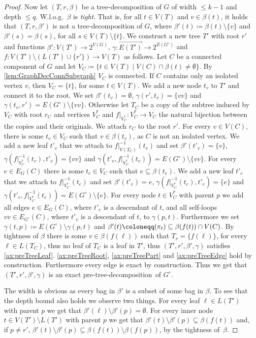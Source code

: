 \documentclass{lmcs}
\theoremstyle{plain}\newtheorem{claim}[thm]{Claim}   %
\let\boundary\relax
\newcommand{\boundary}{\Delta}
\newcommand{\preTreeDec}{pre-tree-decomposition}
\begin{document}
\begin{proof}
	Now let $(T,r,\beta)$ be a tree-decomposition of $G$ of width $\leq k-1$ and depth $\leq q$.
	W.l.o.g.\ $\beta$ is \emph{tight}. That is, for all $t\in V(T)$ and $v\in \beta(t)$, it holds that $(T,r,\beta')$ is not a tree-decomposition of $G$, where $\beta'(t)\coloneqq\beta(t)\setminus\{v\}$ and $\beta'(s)=\beta(s)$, for all $s\in V(T)\setminus \{t\}$.
	We construct a new tree $T'$ with root $r'$ and functions $\beta'\colon V(T')\rightarrow 2^{V(G)}$, $\gamma\colon \overrightarrow{E(T')} \rightarrow 2^{E(G^\circ)}$ and $f\colon V(T')\setminus\left(L(T')\cup\{r'\}\right)\rightarrow V(T)$ as follows.
	Let $C$ be a connected component of $G$ and let $V_C\coloneqq \{t\in V(T)\mid V(C)\cap \beta(t)\neq \emptyset\}$.
	By \autoref{lem:GraphDecConnSubgraph} $V_C$ is connected.
	If $C$ contains only an isolated vertex $v$, then $V_C=\{t\}$, for some $t\in V(T)$.
	We add a new node $t_v$ to $T'$ and connect it to the root.
	We set $\beta'(t_v)=\emptyset$, $\gamma(r',t_v)=\{vv\}$ and $\gamma(t_v,r')= E(G^\circ)\setminus \{vv\}$.
	Otherwise let $T_C$ be a copy of the subtree induced by $V_C$ with root $r_C$ and vertices $V^*_C$ and $f|_{V^*_C}\colon V^*_C\rightarrow V_C$ the natural bijection between the copies and their originals.
	We attach $r_C$ to the root $r'$.
	For every $v\in V(C)$, there is some $t_v\in V_C$ such that $v\in\beta(t_v)$, as $C$ is not an isolated vertex.
	We add a new leaf $t'_v$ that we attach to $f|_{V(T_C)}^{-1}(t_v)$ and set $\beta'(t'_v)=\{v\}$, $\gamma(f|_{V^*_C}^{-1}(t_v),t'_v)=\{vv\}$ and $\gamma(t'_v,f|_{V^*_C}^{-1}(t_v))=E(G^\circ)\setminus \{vv\}$.
	For every $e\in E_G(C)$ there is some $t_e\in V_C$ such that $e\subseteq\beta(t_e)$.
	We add a new leaf $t'_e$ that we attach to $f|_{V^*_C}^{-1}(t_e)$ and set $\beta'(t'_e)=e$, $\gamma(f|_{V^*_C}^{-1}(t_e),t'_e)=\{e\}$ and $\gamma(t'_e,f|_{V^*_C}^{-1}(t_e))=E(G^\circ)\setminus \{e\}$.
	For every node $t\in V^*_C$ with parent $p$ we add all edges $e\in E_G(C)$, where $t'_e$ is a descendant of $t$, and all self-loops $vv\in E_{G^\circ}(C)$, where $t'_v$ is a descendant of $t$, to $\gamma(p,t)$.
	Furthermore we set $\gamma(t,p)\coloneqq E(G^\circ)\setminus \gamma(p,t)$ and $\beta'(t)\coloneqq \boundary(\pi_t)\subseteq\beta(f(t))\cap V(C)$.
	By tightness of $\beta$ there is some $v\in \beta(f(\ell))$ such that $T_v=\{f(\ell)\}$, for every $\ell\in L(T_C)$, thus no leaf of $T_C$ is a leaf in $T'$, thus $(T',r',\beta',\gamma)$ satisfies \ref{ax:preTreeLeaf}.
	\ref{ax:preTreeRoot}, \ref{ax:preTreePart} and \ref{ax:preTreeEdge} hold by construction.
	Furthermore every edge is exact by construction.
	Thus we get that $(T',r',\beta',\gamma)$ is an exact \preTreeDec\ of $G^\circ$.
	
	The width is obvious as every bag in $\beta'$ is a subset of some bag in $\beta$.
	To see that the depth bound also holds we observe two things.
	For every leaf $\ell\in L(T')$ with parent $p$ we get that $\beta'(\ell)\setminus\beta'(p)=\emptyset$.
	For every inner node $t\in V(T')\setminus L(T')$ with parent $p$ we get that $\beta'(t)\setminus\beta'(p)\subseteq \beta(f(t))$ and, if $p\neq r'$, $\beta'(t)\setminus\beta'(p)\subseteq \beta(f(t))\setminus \beta(f(p))$, by the tightness of~$\beta$.
\end{proof}
\end{document}
